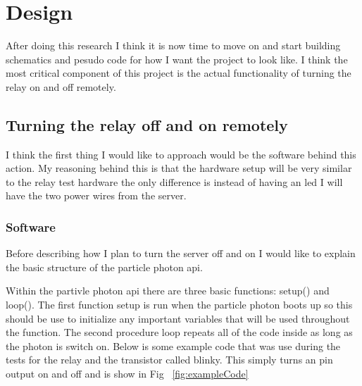 \documentclass{article}
\begin{document}
\section{Design}

After doing this research I think it is now time to move on and start building schematics and pesudo code
for how I want the project to look like. I think the most critical component of this project is the
actual functionality of turning the relay on and off remotely.

\subsection{Turning the relay off and on remotely}
I think the first thing I would like to approach would be the software behind this action. My reasoning
behind this is that the hardware setup will be very similar to the relay test hardware the only difference
is instead of having an led I will have the two power wires from the server.

\subsubsection{Software}
Before describing how I plan to turn the server off and on I would like to explain the basic structure of
the particle photon api.

Within the partivle photon api there are three basic functions: setup() and loop(). The first function
setup is run when the particle photon boots up so this should be use to initialize any important variables
that will be used throughout the function. The second procedure loop repeats all of the code inside as long
as the photon is switch on. Below is some example code that was use during the tests for the relay and the
transistor called blinky. This simply turns an pin output on and off and is show in Fig ~\ref{fig:exampleCode}
\end{document}
